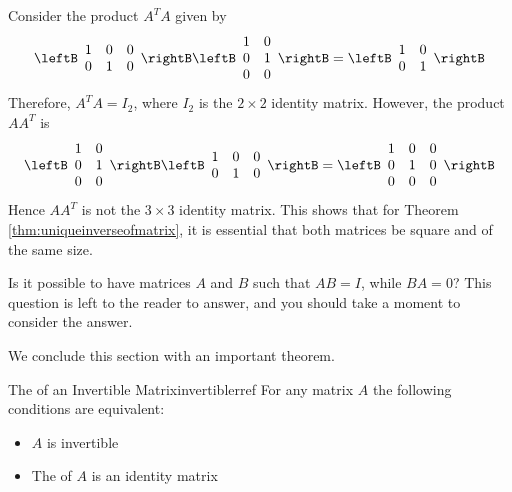 \begin{solution}
Consider the product $A^{T}A$ given by 
\begin{equation*}
\leftB
\begin{array}{rrr}
1 & 0 & 0\\
0 & 1 & 0
\end{array}
\rightB
\leftB
\begin{array}{rr}
1 & 0 \\
0 & 1 \\
0 & 0 
\end{array}
\rightB
=
\leftB
\begin{array}{rr}
1 & 0 \\
0 & 1
\end{array}
\rightB
\end{equation*}
Therefore, $A^{T}A = I_2$, where $I_2$ is the $2 \times 2$ identity matrix.
However, the product $AA^{T}$ is 
\begin{equation*}
\leftB
\begin{array}{rr}
1 & 0 \\
0 & 1 \\
0 & 0 
\end{array}
\rightB
\leftB
\begin{array}{rrr}
1 & 0 & 0\\
0 & 1 & 0
\end{array}
\rightB
=
\leftB
\begin{array}{rrr}
1 & 0 & 0 \\
0 & 1 & 0 \\
0 & 0 & 0
\end{array}
\rightB
\end{equation*}
Hence $AA^{T}$ is not the $3 \times 3$ identity matrix. This shows that for Theorem \ref{thm:uniqueinverseofmatrix}, it is essential that both matrices be square and of the same size.
\end{solution}

Is it possible to have matrices $A$ and $B$ such that $AB=I$, while $BA=0$? This question is left to the reader to answer, and you should take a moment to consider the answer.

We conclude this section with an important theorem.

\begin{theorem}{The \RREF of an Invertible Matrix}{invertiblerref}
For any matrix $A$ the following conditions are equivalent:
\begin{itemize}
\item $A$ is invertible
\item The \rref \;of $A$ is an identity matrix
\end{itemize}
\end{theorem}

